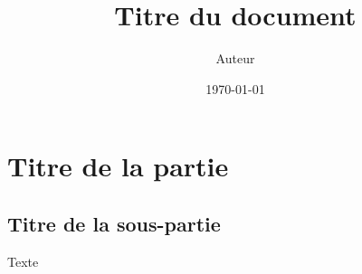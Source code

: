 \documentclass{article}
\title{Titre du document}
\author{Auteur}
\date{\today}
\begin{document}
\maketitle
\tableofcontents

\section{Titre de la partie}

\subsection{Titre de la sous-partie}

Texte
\end{document}
